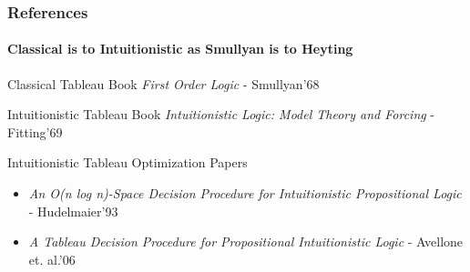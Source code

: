 \documentclass[mathserif]{beamer}
\begin{document}
\begin{frame}
\frametitle{References}
\framesubtitle{Classical is to Intuitionistic as Smullyan is to Heyting}

\begin{block}{Classical Tableau Book}
{\it First Order Logic} - Smullyan'68
\end{block}

\begin{block}{Intuitionistic Tableau Book}
{\it Intuitionistic Logic: Model Theory and Forcing} - Fitting'69
\end{block}

\begin{block}{Intuitionistic Tableau Optimization Papers}
\begin{itemize}
\item {\it An O(n log n)-Space Decision Procedure for Intuitionistic Propositional Logic} - Hudelmaier'93
\item {\it A Tableau Decision Procedure for Propositional Intuitionistic Logic} - Avellone et. al.'06
\end{itemize}
\end{block}

\end{frame}
\end{document}
